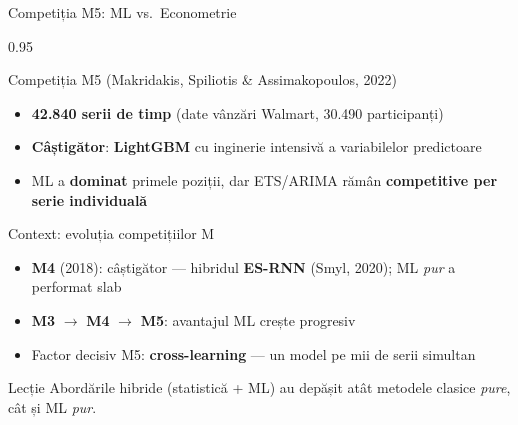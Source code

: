 \documentclass[9pt, aspectratio=169, t]{beamer}
\begin{document}
\begin{frame}{Competiția M5: ML vs.\ Econometrie}
    \vspace{-2mm}
    \begin{cminipage}{0.95\textwidth}
        {\scriptsize
        \begin{block}{Competiția M5 (Makridakis, Spiliotis \& Assimakopoulos, 2022)}
            \begin{itemize}\setlength{\itemsep}{0pt}
                \item \textbf{42.840 serii de timp} (date vânzări Walmart, 30.490 participanți)
                \item \textbf{Câștigător}: \textbf{LightGBM} cu inginerie intensivă a variabilelor predictoare
                \item ML a \textbf{dominat} primele poziții, dar ETS/ARIMA rămân \textbf{competitive per serie individuală}
            \end{itemize}
        \end{block}
        \vspace{-2mm}
        \begin{block}{Context: evoluția competițiilor M}
            \begin{itemize}\setlength{\itemsep}{0pt}
                \item \textbf{M4} (2018): câștigător --- hibridul \textbf{ES-RNN} (Smyl, 2020); ML \emph{pur} a performat slab
                \item \textbf{M3} $\to$ \textbf{M4} $\to$ \textbf{M5}: avantajul ML crește progresiv
                \item Factor decisiv M5: \textbf{cross-learning} --- un model pe mii de serii simultan
            \end{itemize}
        \end{block}
        \vspace{-2mm}
        \begin{alertblock}{Lecție}
            Abordările hibride (statistică + ML) au depășit atât metodele clasice \emph{pure}, cât și ML \emph{pur}.
        \end{alertblock}
        }
    \end{cminipage}
\end{frame}
\end{document}
